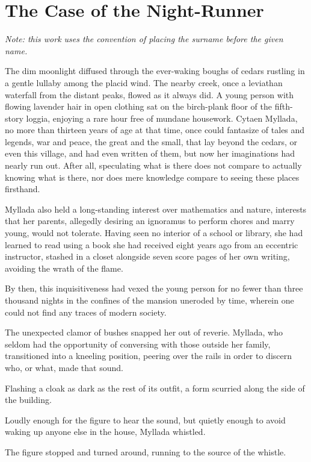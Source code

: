 \chapter{The Case of the Night-Runner}

\emph{Note: this work uses the convention of placing the surname before the given name.}

The dim moonlight diffused through the ever-waking boughs of cedars rustling in a gentle lullaby among the placid wind.  The nearby creek, once a leviathan waterfall from the distant peaks, flowed as it always did. A young person with flowing lavender hair in open clothing sat on the birch-plank floor of the fifth-story loggia, enjoying a rare hour free of mundane housework. Cytaen Myllada, no more than thirteen years of age at that time, once could fantasize of tales and legends, war and peace, the great and the small, that lay beyond the cedars, or even this village, and had even written of them, but now her imaginations had nearly run out. After all, speculating what is there does not compare to actually knowing what is there, nor does mere knowledge compare to seeing these places firsthand.

Myllada also held a long-standing interest over mathematics and nature, interests that her parents, allegedly desiring an ignoramus to perform chores and marry young, would not tolerate. Having seen no interior of a school or library, she had learned to read using a book she had received eight years ago from an eccentric instructor, stashed in a closet alongside seven score pages of her own writing, avoiding the wrath of the flame.

By then, this inquisitiveness had vexed the young person for no fewer than three thousand nights in the confines of the mansion uneroded by time, wherein one could not find any traces of modern society.

The unexpected clamor of bushes snapped her out of reverie. Myllada, who seldom had the opportunity of conversing with those outside her family, transitioned into a kneeling position, peering over the rails in order to discern who, or what, made that sound.

Flashing a cloak as dark as the rest of its outfit, a form scurried along the side of the building.

Loudly enough for the figure to hear the sound, but quietly enough to avoid waking up anyone else in the house, Myllada whistled.

The figure stopped and turned around, running to the source of the whistle.

